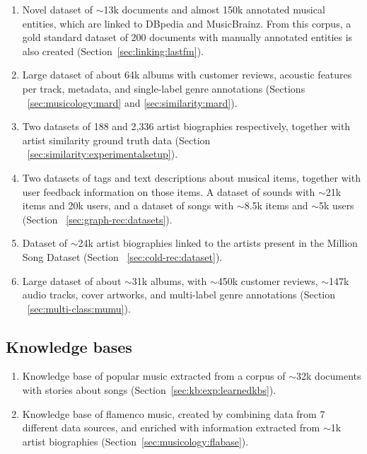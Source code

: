 \begin{enumerate}

\item 
Novel dataset of $\sim$13k documents and almost 150k annotated musical entities, which are linked to DBpedia and MusicBrainz. From this corpus, a gold standard dataset of 200 documents with manually annotated entities is also created (Section~\ref{sec:linking:lastfm}).

\item
Large dataset of about 64k albums with customer reviews, acoustic features per track, metadata, and single-label genre annotations (Sections ~\ref{sec:musicology:mard} and \ref{sec:similarity:mard}).

\item
Two datasets of 188 and 2,336 artist biographies respectively, together with artist similarity ground truth data (Section ~\ref{sec:similarity:experimentalsetup}).

\item
Two datasets of tags and text descriptions about musical items, together with user feedback information on those items. A dataset of sounds with $\sim$21k items and 20k users, and a dataset of songs with $\sim$8.5k items and $\sim$5k users (Section ~\ref{sec:graph-rec:datasets}).

\item
Dataset of $\sim$24k artist biographies linked to the artists present in the Million Song Dataset (Section ~\ref{sec:cold-rec:dataset}).

\item
Large dataset of about $\sim$31k albums, with $\sim$450k customer reviews, $\sim$147k audio tracks, cover artworks, and multi-label genre annotations (Section ~\ref{sec:multi-class:mumu}).

\end{enumerate}

\subsection{Knowledge bases}

\begin{enumerate}
\item
Knowledge base of popular music extracted from a corpus of $\sim$32k documents with stories about songs (Section~\ref{sec:kb:exp:learnedkbs}).

\item
Knowledge base of flamenco music, created by combining data from 7 different data sources, and enriched with information extracted from $\sim$1k artist biographies (Section~\ref{sec:musicology:flabase}).

\end{enumerate}

